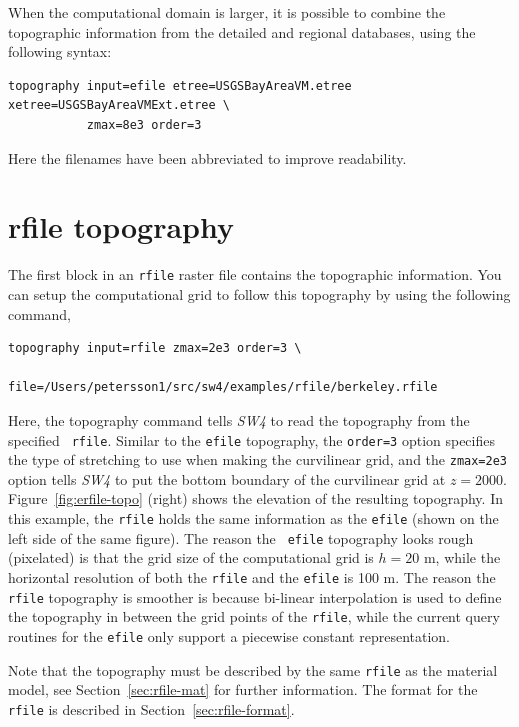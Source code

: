 \documentclass[11pt]{report}
\begin{document}
When the computational domain is larger, it is possible to combine the topographic information from
the detailed and regional databases, using the following syntax:
\begin{verbatim}
topography input=efile etree=USGSBayAreaVM.etree xetree=USGSBayAreaVMExt.etree \
           zmax=8e3 order=3
\end{verbatim}
Here the filenames have been abbreviated to improve readability.

\section{rfile topography}\label{sec:topo-rfile}

The first block in an \verb+rfile+ raster file contains the topographic
information. You can setup the computational grid to follow this topography by using the following command,
\begin{verbatim}
topography input=rfile zmax=2e3 order=3 \
           file=/Users/petersson1/src/sw4/examples/rfile/berkeley.rfile
\end{verbatim}
Here, the topography command tells \emph{SW4} to read the topography from the specified {\tt
  rfile}. Similar to the {\tt efile} topography, the \verb+order=3+ option specifies the type of
stretching to use when making the curvilinear grid, and the \verb+zmax=2e3+ option tells \emph{SW4}
to put the bottom boundary of the curvilinear grid at $z=2000$. Figure~\ref{fig:erfile-topo} (right)
shows the elevation of the resulting topography. In this example, the {\tt rfile} holds the same
information as the {\tt efile} (shown on the left side of the same figure). The reason the {\tt
  efile} topography looks rough (pixelated) is that the grid size of the computational grid is
$h=20$ m, while the horizontal resolution of both the {\tt rfile} and the {\tt efile} is 100 m. The
reason the {\tt rfile} topography is smoother is because bi-linear interpolation is used to define
the topography in between the grid points of the {\tt rfile}, while the current query routines for
the {\tt efile} only support a piecewise constant representation.

Note that the topography must be described by the same {\tt rfile} as the material model, see
Section~\ref{sec:rfile-mat} for further information. The format
for the \verb+rfile+ is described in Section~\ref{sec:rfile-format}. 

\end{document}
